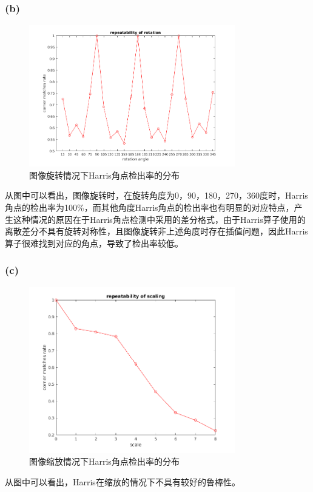\documentclass[a4paper, UTF8]{ctexrep}
\begin{document}
			\subsubsection{(b)}
				\begin{figure}[htbp!]
					\centering
					\includegraphics[width=0.8\textwidth]{hw1_fig3.png}
					\caption{图像旋转情况下Harris角点检出率的分布}
				\end{figure}
				从图中可以看出，图像旋转时，在旋转角度为0，90，180，270，360度时，Harris角点的检出率为100\%，而其他角度Harris角点的检出率也有明显的对应特点，产生这种情况的原因在于Harris角点检测中采用的差分格式，由于Harris算子使用的离散差分不具有旋转对称性，且图像旋转非上述角度时存在插值问题，因此Harris算子很难找到对应的角点，导致了检出率较低。
			\clearpage
			\subsubsection{(c)}
				\begin{figure}[htbp!]
					\centering
					\includegraphics[width=0.8\textwidth]{hw1_fig4.png}
					\caption{图像缩放情况下Harris角点检出率的分布}
				\end{figure}
				从图中可以看出，Harris在缩放的情况下不具有较好的鲁棒性。
			\clearpage
\end{document}
